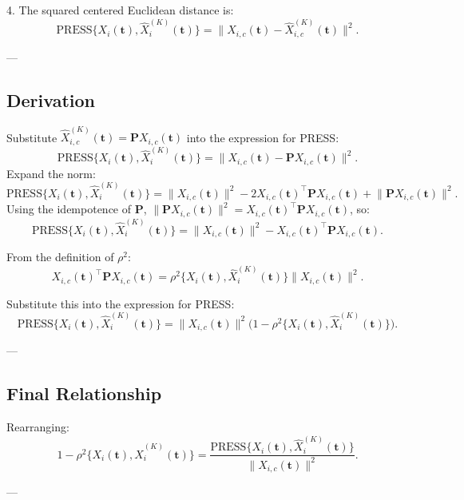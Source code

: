 4. The squared centered Euclidean distance is:
\[
\text{PRESS}\bigg\{ X_{i}(\mathbf{t}), \widehat{X}^{(K)}_{i} (\mathbf{t}) \bigg\} 
= \bigg\| X_{i,c}(\mathbf{t}) - \widehat{X}^{(K)}_{i,c}(\mathbf{t}) \bigg\|^2.
\]

---

\subsection*{Derivation}

Substitute \( \widehat{X}^{(K)}_{i,c}(\mathbf{t}) = \mathbf{P} X_{i,c}(\mathbf{t}) \) into the expression for PRESS:
\[
\text{PRESS}\bigg\{ X_{i}(\mathbf{t}), \widehat{X}^{(K)}_{i} (\mathbf{t}) \bigg\}
= \bigg\| X_{i,c}(\mathbf{t}) - \mathbf{P} X_{i,c}(\mathbf{t}) \bigg\|^2.
\]
Expand the norm:
\[
\text{PRESS}\bigg\{ X_{i}(\mathbf{t}), \widehat{X}^{(K)}_{i} (\mathbf{t}) \bigg\}
= \bigg\| X_{i,c}(\mathbf{t}) \bigg\|^2 - 2 X_{i,c}(\mathbf{t})^\top \mathbf{P} X_{i,c}(\mathbf{t}) + \bigg\| \mathbf{P} X_{i,c}(\mathbf{t}) \bigg\|^2.
\]
Using the idempotence of \( \mathbf{P} \), \( \big\| \mathbf{P} X_{i,c}(\mathbf{t}) \big\|^2 = X_{i,c}(\mathbf{t})^\top \mathbf{P} X_{i,c}(\mathbf{t}) \), so:
\[
\text{PRESS}\bigg\{ X_{i}(\mathbf{t}), \widehat{X}^{(K)}_{i} (\mathbf{t}) \bigg\}
= \bigg\| X_{i,c}(\mathbf{t}) \bigg\|^2 - X_{i,c}(\mathbf{t})^\top \mathbf{P} X_{i,c}(\mathbf{t}).
\]

From the definition of \( \rho^2 \):
\[
X_{i,c}(\mathbf{t})^\top \mathbf{P} X_{i,c}(\mathbf{t}) 
= \rho^2 \bigg\{ X_{i}(\mathbf{t}), \widehat{X}^{(K)}_{i} (\mathbf{t}) \bigg\} \bigg\| X_{i,c}(\mathbf{t}) \bigg\|^2.
\]

Substitute this into the expression for PRESS:
\[
\text{PRESS}\bigg\{ X_{i}(\mathbf{t}), \widehat{X}^{(K)}_{i} (\mathbf{t}) \bigg\}
= \bigg\| X_{i,c}(\mathbf{t}) \bigg\|^2 \bigg( 1 - \rho^2 \bigg\{ X_{i}(\mathbf{t}), \widehat{X}^{(K)}_{i} (\mathbf{t}) \bigg\} \bigg).
\]

---

\subsection*{Final Relationship}

Rearranging:
\[
1 - \rho^2 \bigg\{ X_{i}(\mathbf{t}), \widehat{X}^{(K)}_{i} (\mathbf{t}) \bigg\}
= \frac{\text{PRESS}\bigg\{ X_{i}(\mathbf{t}), \widehat{X}^{(K)}_{i} (\mathbf{t}) \bigg\}}
{\bigg\| X_{i,c}(\mathbf{t}) \bigg\|^2}.
\]

---

